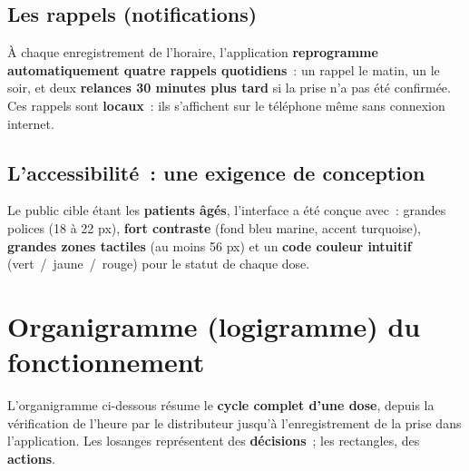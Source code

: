 \documentclass[11pt,a4paper]{report}
\begin{document}
\subsection{Les rappels (notifications)}

\`A chaque enregistrement de l'horaire, l'application \textbf{reprogramme automatiquement
quatre rappels quotidiens}~: un rappel le matin, un le soir, et deux \textbf{relances 30
minutes plus tard} si la prise n'a pas \'et\'e confirm\'ee. Ces rappels sont \textbf{locaux}~:
ils s'affichent sur le t\'el\'ephone m\^eme sans connexion internet.

\subsection{L'accessibilit\'e~: une exigence de conception}

Le public cible \'etant les \textbf{patients \^ag\'es}, l'interface a \'et\'e con\c cue avec~:
grandes polices (18 \`a 22 px), \textbf{fort contraste} (fond bleu marine, accent turquoise),
\textbf{grandes zones tactiles} (au moins 56 px) et un \textbf{code couleur intuitif}
(vert~/~jaune~/~rouge) pour le statut de chaque dose.

\section{Organigramme (logigramme) du fonctionnement}

L'organigramme ci-dessous r\'esume le \textbf{cycle complet d'une dose}, depuis la
v\'erification de l'heure par le distributeur jusqu'\`a l'enregistrement de la prise dans
l'application. Les losanges repr\'esentent des \textbf{d\'ecisions}~; les rectangles, des
\textbf{actions}.
\end{document}

